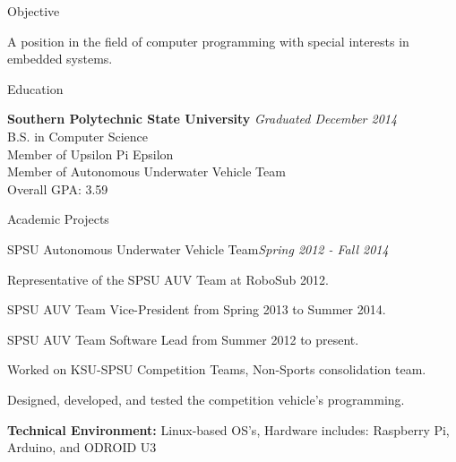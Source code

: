 \documentclass[11pt]{resume} %
\begin{document}
\begin{rSection}{Objective}

A position in the field of computer programming with special interests in embedded systems.

\end{rSection}


\begin{rSection}{Education}

{\bf Southern Polytechnic State University} \hfill {\em Graduated December 2014} \\ 
B.S. in Computer Science \\%
Member of Upsilon Pi Epsilon \\
Member of Autonomous Underwater Vehicle Team \\
Overall GPA: 3.59

\end{rSection}

\begin{rSection}{Academic Projects}

\begin{rSubsection}{SPSU Autonomous Underwater Vehicle Team}{\em Spring 2012 - Fall 2014}{}{}

\item Representative of the SPSU AUV Team at RoboSub 2012.
\item SPSU AUV Team Vice-President from Spring 2013 to Summer 2014.
\item SPSU AUV Team Software Lead from Summer 2012 to present.
\item Worked on KSU-SPSU Competition Teams, Non-Sports consolidation team.
\item Designed, developed, and tested the competition vehicle's programming.
\item \textbf{Technical Environment:} Linux-based OS's, Hardware includes: Raspberry Pi, Arduino, and ODROID U3
\end{rSubsection}

\end{rSection}
\end{document}
